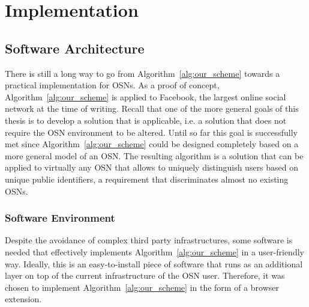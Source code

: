 \chapter{Implementation}
\label{cha:n}




\section{Software Architecture}
There is still a long way to go from Algorithm~\ref{alg:our_scheme} towards a practical implementation for OSNs. As a proof of concept, Algorithm~\ref{alg:our_scheme} is applied to Facebook, the largest online social network at the time of writing. Recall that one of the more general goals of this thesis is to develop a solution that is applicable, i.e. a solution that does not require the OSN environment to be altered. Until so far this goal is successfully met since Algorithm~\ref{alg:our_scheme} could be designed completely based on a more general model of an OSN. The resulting algorithm is a solution that can be applied to virtually any OSN that allows to uniquely distinguish users based on unique public identifiers, a requirement that discriminates almost no existing OSNs.

\subsection{Software Environment}
Despite the avoidance of complex third party infrastructures, some software is needed that effectively implements Algorithm~\ref{alg:our_scheme} in a user-friendly way. Ideally, this is an easy-to-install piece of software that runs as an additional layer on top of the current infrastructure of the OSN user. Therefore, it was chosen to implement Algorithm~\ref{alg:our_scheme} in the form of a browser extension.

